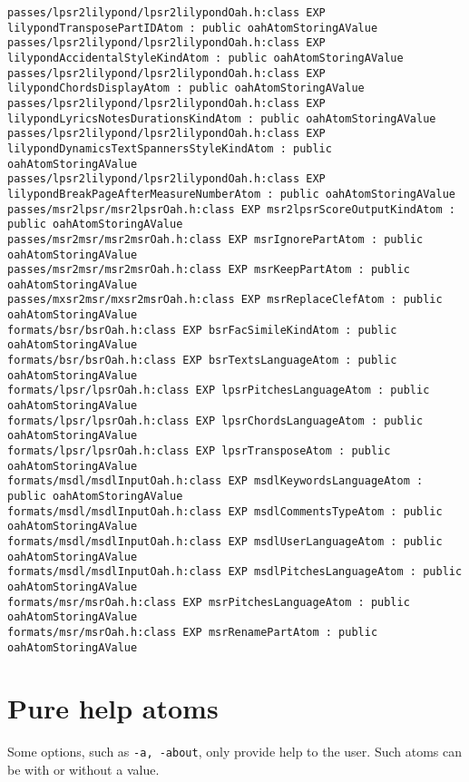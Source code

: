 \begin{lstlisting}[language=Terminal]
passes/lpsr2lilypond/lpsr2lilypondOah.h:class EXP lilypondTransposePartIDAtom : public oahAtomStoringAValue
passes/lpsr2lilypond/lpsr2lilypondOah.h:class EXP lilypondAccidentalStyleKindAtom : public oahAtomStoringAValue
passes/lpsr2lilypond/lpsr2lilypondOah.h:class EXP lilypondChordsDisplayAtom : public oahAtomStoringAValue
passes/lpsr2lilypond/lpsr2lilypondOah.h:class EXP lilypondLyricsNotesDurationsKindAtom : public oahAtomStoringAValue
passes/lpsr2lilypond/lpsr2lilypondOah.h:class EXP lilypondDynamicsTextSpannersStyleKindAtom : public oahAtomStoringAValue
passes/lpsr2lilypond/lpsr2lilypondOah.h:class EXP lilypondBreakPageAfterMeasureNumberAtom : public oahAtomStoringAValue
passes/msr2lpsr/msr2lpsrOah.h:class EXP msr2lpsrScoreOutputKindAtom : public oahAtomStoringAValue
passes/msr2msr/msr2msrOah.h:class EXP msrIgnorePartAtom : public oahAtomStoringAValue
passes/msr2msr/msr2msrOah.h:class EXP msrKeepPartAtom : public oahAtomStoringAValue
passes/mxsr2msr/mxsr2msrOah.h:class EXP msrReplaceClefAtom : public oahAtomStoringAValue
formats/bsr/bsrOah.h:class EXP bsrFacSimileKindAtom : public oahAtomStoringAValue
formats/bsr/bsrOah.h:class EXP bsrTextsLanguageAtom : public oahAtomStoringAValue
formats/lpsr/lpsrOah.h:class EXP lpsrPitchesLanguageAtom : public oahAtomStoringAValue
formats/lpsr/lpsrOah.h:class EXP lpsrChordsLanguageAtom : public oahAtomStoringAValue
formats/lpsr/lpsrOah.h:class EXP lpsrTransposeAtom : public oahAtomStoringAValue
formats/msdl/msdlInputOah.h:class EXP msdlKeywordsLanguageAtom : public oahAtomStoringAValue
formats/msdl/msdlInputOah.h:class EXP msdlCommentsTypeAtom : public oahAtomStoringAValue
formats/msdl/msdlInputOah.h:class EXP msdlUserLanguageAtom : public oahAtomStoringAValue
formats/msdl/msdlInputOah.h:class EXP msdlPitchesLanguageAtom : public oahAtomStoringAValue
formats/msr/msrOah.h:class EXP msrPitchesLanguageAtom : public oahAtomStoringAValue
formats/msr/msrOah.h:class EXP msrRenamePartAtom : public oahAtomStoringAValue
\end{lstlisting}


\section{Pure help atoms}

Some options, such as {\tt -a, -about}, only provide help to the user. Such  atoms can be with or without a value.


